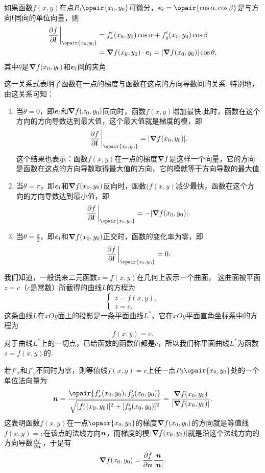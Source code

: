 \begin{theorem}\label{theorem:多元函数微分法.方向导数与梯度的关系}
如果函数\(f(x,y)\)在点\(P_0\opair{x_0,y_0}\)可微分，\(\mat{e}_l=\opair{\cos\alpha,\cos\beta}\)是与方向\(\boldsymbol{l}\)同向的单位向量，则\begin{equation}
\begin{split}
\pdv{f}{\mat{l}}\eval_{\opair{x_0,y_0}}
&= f'_x(x_0,y_0) \cos\alpha + f'_y(x_0,y_0) \cos\beta \\
&= \grad{f}(x_0,y_0) \cdot \mat{e}_l
= \abs{\grad{f}(x_0,y_0)} \cos\theta,
\end{split}
\end{equation}其中\(\theta\)是\(\grad{f}(x_0,y_0)\)和\(\boldsymbol{e}_l\)间的夹角.
\end{theorem}
这一关系式表明了函数在一点的梯度与函数在这点的方向导数间的关系.
特别地，由这关系可知：
\begin{enumerate}
\item 当\(\theta=0\)，即\(\boldsymbol{e}_l\)和\(\grad{f}(x_0,y_0)\)同向时，函数\(f(x,y)\)增加最快.此时，函数在这个方向的方向导数达到最大值，这个最大值就是梯度的模，即\[
\pdv{f}{\mat{l}}\eval_{\opair{x_0,y_0}} = \abs{\grad{f}(x_0,y_0)}.
\]这个结果也表示：函数\(f(x,y)\)在一点的梯度\(\grad{f}\)是这样一个向量，它的方向是函数在这点的方向导数取得最大值的方向，它的模就等于方向导数的最大值.

\item 当\(\theta=\pi\)，即\(\boldsymbol{e}_l\)和\(\grad{f}(x_0,y_0)\)反向时，函数\((f(x,y)\)减少最快，函数在这个方向的方向导数达到最小值，即\[
\pdv{f}{\mat{l}}\eval_{\opair{x_0,y_0}} = -\abs{\grad{f}(x_0,y_0)}.
\]

\item 当\(\theta=\frac{\pi}{2}\)，即\(\boldsymbol{e}_l\)和\(\grad{f}(x_0,y_0)\)正交时，函数的变化率为零，即\[
\pdv{f}{\mat{l}}\eval_{\opair{x_0,y_0}} = 0.
\]
\end{enumerate}

我们知道，一般说来二元函数\(z = f(x,y)\)在几何上表示一个曲面，%
这曲面被平面\(z = c\)（\(c\)是常数）所截得的曲线\(L\)的方程为\[
\left\{ \begin{array}{l}
z = f(x,y), \\
z = c.
\end{array} \right.
\]这条曲线\(L\)在\(xOy\)面上的投影是一条平面曲线\(L^*\)，它在\(xOy\)平面直角坐标系中的方程为\[
f(x,y) = c.
\]对于曲线\(L^*\)上的一切点，已给函数的函数值都是\(c\)，所以我们称平面曲线\(L^*\)为函数\(z = f(x,y)\)的.

若\(f'_x\)和\(f'_y\)不同时为零，则等值线\(f(x,y) = c\)上任一点\(P_0\opair{x_0,y_0}\)处的一个单位法向量为\[
\mat{n}
= \frac{\opair{f'_x(x_0,y_0),f'_y(x_0,y_0)}}{\sqrt{[f'_x(x_0,y_0)]^2+[f'_y(x_0,y_0)]^2}}
= \frac{\grad f(x_0,y_0)}{\abs{\grad f(x_0,y_0)}}.
\]
这表明函数\(f(x,y)\)在一点\(\opair{x_0,y_0}\)的梯度\(\grad f(x_0,y_0)\)的方向就是等值线\(f(x,y) = c\)在该点的法线方向\(\boldsymbol{n}\)，而梯度的模\(\abs{\grad f(x_0,y_0)}\)就是沿这个法线方向的方向导数\(\pdv{f}{\boldsymbol{n}}\)，于是有\[
\grad f(x_0,y_0) = \pdv{f}{\boldsymbol{n}} \frac{\boldsymbol{n}}{\abs{\boldsymbol{n}}}.
\]

